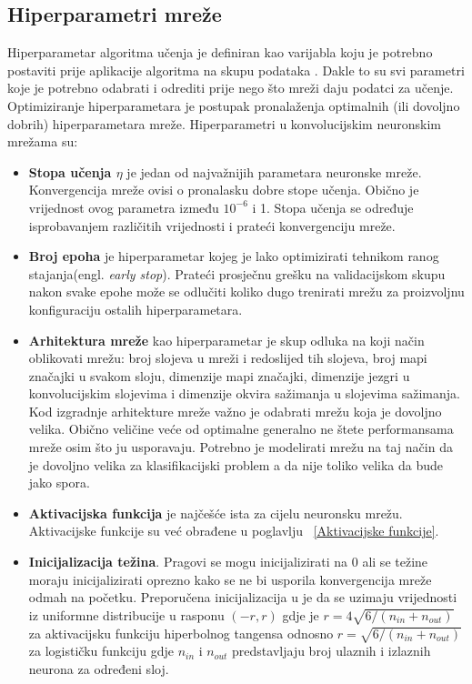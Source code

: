 \documentclass[times, utf8, zavrsni, numeric]{fer}
\begin{document}
\subsection{Hiperparametri mreže}
Hiperparametar algoritma učenja je definiran kao varijabla koju je potrebno postaviti prije aplikacije algoritma na skupu podataka \citep{bengio2012practical}. Dakle to su svi parametri koje je potrebno odabrati i odrediti prije nego što mreži daju podatci za učenje. Optimiziranje hiperparametara je postupak pronalaženja optimalnih (ili dovoljno dobrih) hiperparametara mreže. Hiperparametri u konvolucijskim neuronskim mrežama su:
\begin{itemize}
\renewcommand\labelitemi{$\bullet$}
\item \textbf{Stopa učenja $\eta$} je jedan od najvažnijih parametara neuronske mreže. Konvergencija mreže ovisi o pronalasku dobre stope učenja. Obično je vrijednost ovog parametra između $10^{-6}$ i 1. Stopa učenja se određuje isprobavanjem različitih vrijednosti i prateći konvergenciju mreže.

\item \textbf{Broj epoha} je hiperparametar kojeg je lako optimizirati tehnikom ranog stajanja(engl. \textit{early stop}). Prateći prosječnu grešku na validacijskom skupu nakon svake epohe može se odlučiti koliko dugo trenirati mrežu za proizvoljnu konfiguraciju ostalih hiperparametara.

\item \textbf{Arhitektura mreže} kao hiperparametar je skup odluka na koji način oblikovati mrežu: broj slojeva u mreži i redoslijed tih slojeva, broj mapi značajki u svakom sloju, dimenzije mapi značajki,
dimenzije jezgri u konvolucijskim slojevima i dimenzije okvira sažimanja u slojevima sažimanja. Kod izgradnje arhitekture mreže važno je odabrati mrežu koja je dovoljno velika. Obično veličine veće od optimalne generalno ne štete performansama mreže osim što ju usporavaju. Potrebno je modelirati mrežu na taj način da je dovoljno velika za klasifikacijski problem a da nije toliko velika da bude jako spora.

\item \textbf{Aktivacijska funkcija} je najčešće ista za cijelu neuronsku mrežu. Aktivacijske funkcije su već obrađene u poglavlju ~\ref{Aktivacijske funkcije}. 

\item \textbf{Inicijalizacija težina}. Pragovi se mogu inicijalizirati na 0 ali se težine moraju inicijalizirati oprezno kako se ne bi usporila konvergencija mreže odmah na početku. Preporučena inicijalizacija u \citep{glorot2010understanding} je da se uzimaju vrijednosti iz uniformne distribucije u rasponu $(-r, r)$ gdje je $r = 4\sqrt{6/(n_{in} + n_{out})}$ za aktivacijsku funkciju hiperbolnog tangensa odnosno $r = \sqrt{6/(n_{in} + n_{out})}$ za logističku funkciju gdje $n_{in}$ i $n_{out}$ predstavljaju broj ulaznih i izlaznih neurona za određeni sloj.


\end{itemize}
\end{document}
